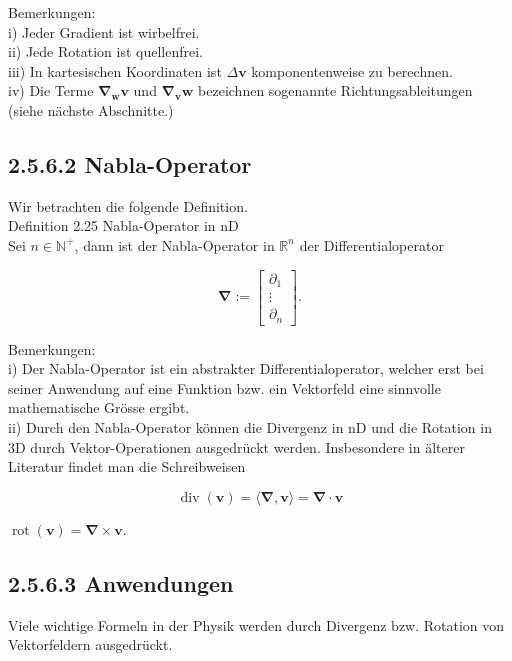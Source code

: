 \documentclass[10pt]{article}
\begin{document}
Bemerkungen:\\
i) Jeder Gradient ist wirbelfrei.\\
ii) Jede Rotation ist quellenfrei.\\
iii) In kartesischen Koordinaten ist $\Delta \mathbf{v}$ komponentenweise zu berechnen.\\
iv) Die Terme $\boldsymbol{\nabla}_{\mathbf{w}} \mathbf{v}$ und $\boldsymbol{\nabla}_{\mathbf{v}} \mathbf{w}$ bezeichnen sogenannte Richtungsableitungen (siehe nächste Abschnitte.)

\subsection*{2.5.6.2 Nabla-Operator}
Wir betrachten die folgende Definition.\\
Definition 2.25 Nabla-Operator in nD\\
Sei $n \in \mathbb{N}^{+}$, dann ist der Nabla-Operator in $\mathbb{R}^{n}$ der Differentialoperator

\[
\boldsymbol{\nabla}:=\left[\begin{array}{c}
\partial_{1}  \tag{2.159}\\
\vdots \\
\partial_{n}
\end{array}\right] .
\]

Bemerkungen:\\
i) Der Nabla-Operator ist ein abstrakter Differentialoperator, welcher erst bei seiner Anwendung auf eine Funktion bzw. ein Vektorfeld eine sinnvolle mathematische Grösse ergibt.\\
ii) Durch den Nabla-Operator können die Divergenz in nD und die Rotation in 3D durch Vektor-Operationen ausgedrückt werden. Insbesondere in älterer Literatur findet man die Schreibweisen


\begin{equation*}
\operatorname{div}(\mathbf{v})=\langle\boldsymbol{\nabla}, \mathbf{v}\rangle=\boldsymbol{\nabla} \cdot \mathbf{v} \tag{2.160}
\end{equation*}


$\operatorname{rot}(\mathbf{v})=\boldsymbol{\nabla} \times \mathbf{v}$.

\subsection*{2.5.6.3 Anwendungen}
Viele wichtige Formeln in der Physik werden durch Divergenz bzw. Rotation von Vektorfeldern ausgedrückt.
\end{document}
